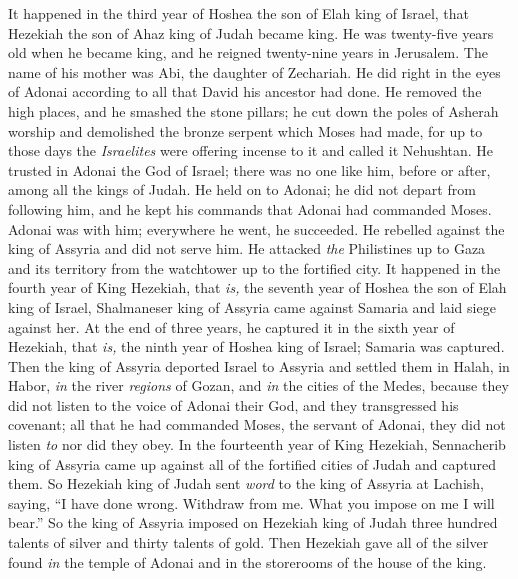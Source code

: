 \begin{biblechapter} %
 It happened in the third year of Hoshea the son of Elah king of Israel, that Hezekiah the son of Ahaz king of Judah became king.
\verse He was twenty-five years old when he became king, and he reigned twenty-nine years in Jerusalem. The name of his mother was Abi, the daughter of Zechariah.
\verse He did right in the eyes of Adonai according to all that David his ancestor had done.
\verse He removed the high places, and he smashed the stone pillars; he cut down the poles of Asherah worship and demolished the bronze serpent which Moses had made, for up to those days the \textit{Israelites} were offering incense to it and called it Nehushtan.
\verse He trusted in Adonai the God of Israel; there was no one like him, before or after, among all the kings of Judah.
\verse He held on to Adonai; he did not depart from following him, and he kept his commands that Adonai had commanded Moses.
\verse Adonai was with him; everywhere he went, he succeeded. He rebelled against the king of Assyria and did not serve him.
\verse He attacked \textit{the} Philistines up to Gaza and its territory from the watchtower up to the fortified city.
\verse It happened in the fourth year of King Hezekiah, that \textit{is,} the seventh year of Hoshea the son of Elah king of Israel, Shalmaneser king of Assyria came against Samaria and laid siege against her.
\verse At the end of three years, he captured it in the sixth year of Hezekiah, that \textit{is,} the ninth year of Hoshea king of Israel; Samaria was captured.
\verse Then the king of Assyria deported Israel to Assyria and settled them in Halah, in Habor, \textit{in} the river \textit{regions} of Gozan, and \textit{in} the cities of the Medes,
\verse because they did not listen to the voice of Adonai their God, and they transgressed his covenant; all that he had commanded Moses, the servant of Adonai, they did not listen \textit{to} nor did they obey.
 In the fourteenth year of King Hezekiah, Sennacherib king of Assyria came up against all of the fortified cities of Judah and captured them.
\verse So Hezekiah king of Judah sent \textit{word} to the king of Assyria at Lachish, saying, “I have done wrong. Withdraw from me. What you impose on me I will bear.” So the king of Assyria imposed on Hezekiah king of Judah three hundred talents of silver and thirty talents of gold.
\verse Then Hezekiah gave all of the silver found \textit{in} the temple of Adonai and in the storerooms of the house of the king.

\end{biblechapter}
